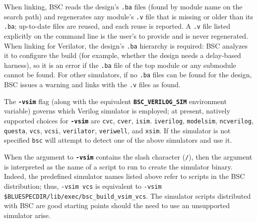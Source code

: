 \documentclass{article}
\newcommand{\te}[1]{\texttt{#1}}
\begin{document}
When linking, BSC reads the design's \te{.ba} files (found by module
name on the search path) and regenerates any module's \te{.v} file
that is missing or older than its \te{.ba}; up-to-date files are
reused, and each reuse is reported.  A \te{.v} file listed explicitly
on the command line is the user's to provide and is never regenerated.
When linking for Verilator, the design's \te{.ba} hierarchy is
required: BSC analyzes it to configure the build (for example, whether
the design needs a delay-based harness), so it is an error if the
\te{.ba} file of the top module or any submodule cannot be found.  For
other simulators, if no \te{.ba} files can be found for the design,
BSC issues a warning and links with the \te{.v} files as found.



\index{-vsim@\te{-vsim} (compiler flag)}

\label{sec:using-verilog}
The \textbf{\texttt{-vsim}} flag
(along with the equivalent
\textbf{\texttt{BSC\_VERILOG\_SIM}} environment variable) governs which Verilog
simulator is employed; at present, natively supported choices for
\textbf{\texttt{-vsim}} are
\texttt{cvc},
\texttt{cver},
\texttt{isim}.
\texttt{iverilog},
\texttt{modelsim},
\texttt{ncverilog},
\texttt{questa},
\texttt{vcs},
\texttt{vcsi},
\texttt{verilator},
\texttt{veriwell},
and \texttt{xsim}.
If the simulator is not specified \texttt{bsc} will attempt to detect one
of the above simulators and use it.

When the argument to \textbf{\texttt{-vsim}} contains the slash character
(\texttt{/}), then the argument is interpreted as the name of a script to run
to create the simulator binary.  Indeed, the predefined simulator names listed
above refer to scripts in the BSC distribution; thus,
\texttt{-vsim vcs} is equivalent to \texttt{-vsim
\$BLUESPECDIR/lib/exec/bsc\_build\_vsim\_vcs}.  The simulator scripts distributed
with BSC are good starting points should the need to use an unsupported
simulator arise.
\end{document}
